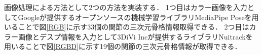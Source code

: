 \documentclass[titlepage]{jarticle}
\begin{document}
画像処理による方法として2つの方法を実装する．
1つ目はカラー画像を入力としてGoogleが提供するオープンソースの機械学習ライブラリMediaPipe Poseを用いることで図\ref{RGB}に示す33個の関節の三次元骨格情報取得できる．
2つ目はカラー画像とデスプ情報を入力として3DiVi Incが提供するライブラリNuitrackを用いることで図\ref{RGBD}に示す19個の関節の三次元骨格情報が取得できる．

\end{document}
